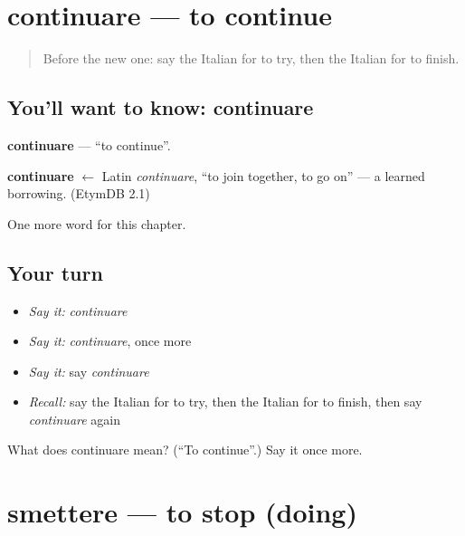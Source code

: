 \section[continuare]{continuare — to continue}

\label{lesson:IT-C205-continuare}



\begin{quote}
Before the new one: say the Italian for to try, then the Italian for to finish.
\end{quote}

\subsection*{You'll want to know: continuare}
\textbf{continuare} — \textquotedblleft{}to continue\textquotedblright{}.

\begin{cousinweb}
\textbf{continuare} $\leftarrow$ Latin \emph{continuare}, \textquotedblleft{}to join together, to go on\textquotedblright{} — a learned borrowing. (EtymDB 2.1)
\end{cousinweb}

\begin{grammarlens}[title={What you've built}]
One more word for this chapter.
\end{grammarlens}

\subsection*{Your turn}
\begin{itemize}
\raggedright
  \item \emph{Say it:} \emph{continuare}
  \item \emph{Say it:} \emph{continuare}, once more
  \item \emph{Say it:} say \emph{continuare}
  \item \emph{Recall:} say the Italian for to try, then the Italian for to finish, then say \emph{continuare} again
\end{itemize}

\begin{tcolorbox}[breakable,colback=teal!4,colframe=teal!35!black,title={Before you move on}]
What does continuare mean? (\textquotedblleft{}To continue\textquotedblright{}.) Say it once more.
\end{tcolorbox}
\section[smettere]{smettere — to stop (doing)}

